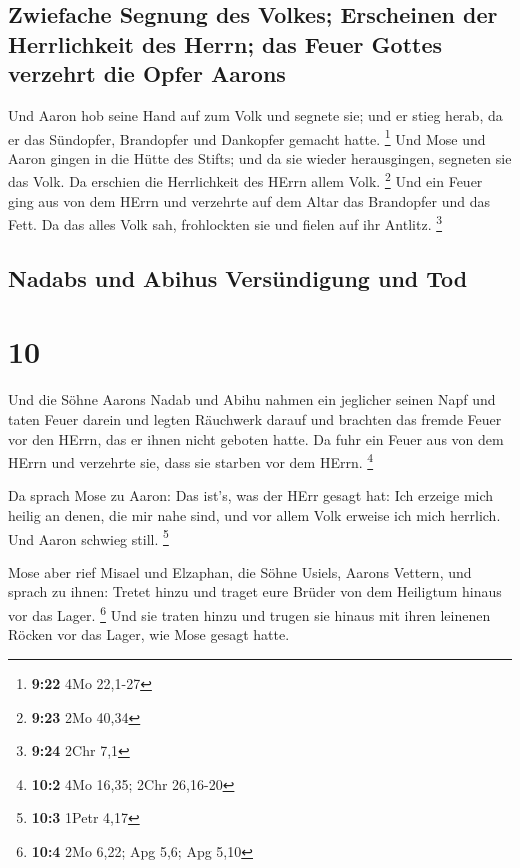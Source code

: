\hypertarget{zwiefache-segnung-des-volkes-erscheinen-der-herrlichkeit-des-herrn-das-feuer-gottes-verzehrt-die-opfer-aarons}{%
\subsection{Zwiefache Segnung des Volkes; Erscheinen der Herrlichkeit
des Herrn; das Feuer Gottes verzehrt die Opfer
Aarons}\label{zwiefache-segnung-des-volkes-erscheinen-der-herrlichkeit-des-herrn-das-feuer-gottes-verzehrt-die-opfer-aarons}}

 Und Aaron hob seine Hand auf zum Volk und segnete sie;
und er stieg herab, da er das Sündopfer, Brandopfer und Dankopfer
gemacht hatte. \footnote{\textbf{9:22} 4Mo 22,1-27}  Und
Mose und Aaron gingen in die Hütte des Stifts; und da sie wieder
herausgingen, segneten sie das Volk. Da erschien die Herrlichkeit des
HErrn allem Volk. \footnote{\textbf{9:23} 2Mo 40,34}  Und
ein Feuer ging aus von dem HErrn und verzehrte auf dem Altar das
Brandopfer und das Fett. Da das alles Volk sah, frohlockten sie und
fielen auf ihr Antlitz. \footnote{\textbf{9:24} 2Chr 7,1}

\hypertarget{nadabs-und-abihus-versuxfcndigung-und-tod}{%
\subsection{Nadabs und Abihus Versündigung und
Tod}\label{nadabs-und-abihus-versuxfcndigung-und-tod}}

\hypertarget{section-9}{%
\section{10}\label{section-9}}

 Und die Söhne Aarons Nadab und Abihu nahmen ein jeglicher
seinen Napf und taten Feuer darein und legten Räuchwerk darauf und
brachten das fremde Feuer vor den HErrn, das er ihnen nicht geboten
hatte.  Da fuhr ein Feuer aus von dem HErrn und verzehrte
sie, dass sie starben vor dem HErrn. \footnote{\textbf{10:2} 4Mo 16,35;
  2Chr 26,16-20}

 Da sprach Mose zu Aaron: Das ist's, was der HErr gesagt
hat: Ich erzeige mich heilig an denen, die mir nahe sind, und vor allem
Volk erweise ich mich herrlich. Und Aaron schwieg still. \footnote{\textbf{10:3}
  1Petr 4,17}

 Mose aber rief Misael und Elzaphan, die Söhne Usiels,
Aarons Vettern, und sprach zu ihnen: Tretet hinzu und traget eure Brüder
von dem Heiligtum hinaus vor das Lager. \footnote{\textbf{10:4} 2Mo
  6,22; Apg 5,6; Apg 5,10}  Und sie traten hinzu und
trugen sie hinaus mit ihren leinenen Röcken vor das Lager, wie Mose
gesagt hatte.

